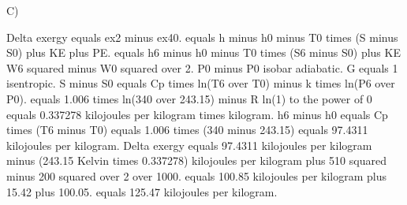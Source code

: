 C)

Delta exergy equals ex2 minus ex40.  
equals h minus h0 minus T0 times (S minus S0) plus KE plus PE.  
equals h6 minus h0 minus T0 times (S6 minus S0) plus KE W6 squared minus W0 squared over 2.  
P0 minus P0 isobar adiabatic.  
G equals 1 isentropic.  
S minus S0 equals Cp times ln(T6 over T0) minus k times ln(P6 over P0).  
equals 1.006 times ln(340 over 243.15) minus R ln(1) to the power of 0 equals 0.337278 kilojoules per kilogram times kilogram.  
h6 minus h0 equals Cp times (T6 minus T0) equals 1.006 times (340 minus 243.15) equals 97.4311 kilojoules per kilogram.  
Delta exergy equals 97.4311 kilojoules per kilogram minus (243.15 Kelvin times 0.337278) kilojoules per kilogram plus 510 squared minus 200 squared over 2 over 1000.  
equals 100.85 kilojoules per kilogram plus 15.42 plus 100.05.  
equals 125.47 kilojoules per kilogram.